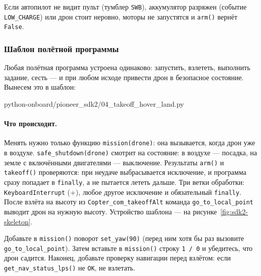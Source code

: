 \begin{warnbox}
Если автопилот не видит пульт (тумблер \texttt{SWB}), аккумулятор разряжен (событие \texttt{LOW\_CHARGE}) или дрон стоит неровно, моторы не запустятся и \verb|arm()| вернёт \verb|False|.
\end{warnbox}

\subsubsection*{Шаблон полётной программы}

Любая полётная программа устроена одинаково: запустить, взлететь, выполнить задание, сесть --- и при любом исходе привести дрон в безопасное состояние. Вынесем это в шаблон:

\begin{codefile}[python]{python-onboard/pioneer_sdk2/04_takeoff_hover_land.py}
\end{codefile}

\paragraph{Что происходит.} Менять нужно только функцию \verb|mission(drone)|: она вызывается, когда дрон уже в воздухе. \verb|safe_shutdown(drone)| смотрит на состояние: в воздухе --- посадка, на земле с включёнными двигателями --- выключение. Результаты \verb|arm()| и \verb|takeoff()| проверяются: при неудаче выбрасывается исключение, и программа сразу попадает в \verb|finally|, а не пытается лететь дальше. Три ветки обработки: \verb|KeyboardInterrupt| (+), любое другое исключение и обязательный \verb|finally|. После взлёта на высоту из \texttt{Copter\_com\_takeoffAlt} команда \verb|go_to_local_point| выводит дрон на нужную высоту. Устройство шаблона --- на рисунке~\ref{fig:sdk2-skeleton}.



\begin{taskbox}
Добавьте в \verb|mission()| поворот \verb|set_yaw(90)| (перед ним хотя бы раз вызовите \verb|go_to_local_point|). Затем вставьте в \verb|mission()| строку \verb|1 / 0| и убедитесь, что дрон садится. Наконец, добавьте проверку навигации перед взлётом: если \verb|get_nav_status_lps()| не \texttt{OK}, не взлетать.
\end{taskbox}
